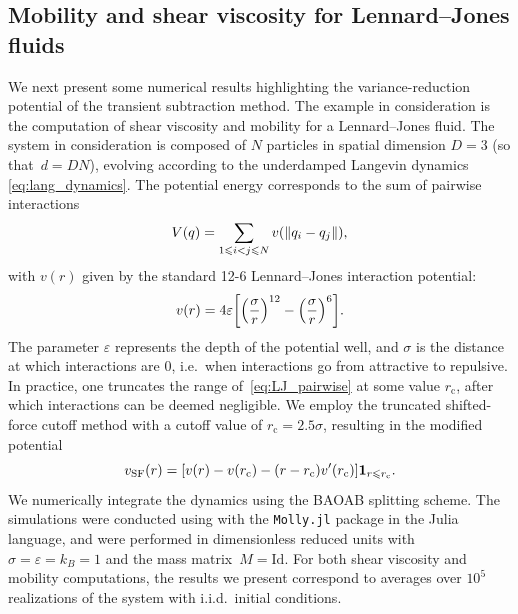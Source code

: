 \subsection{Mobility and shear viscosity for Lennard--Jones fluids}
\label{subsec:num_LJ}
%
We next present some numerical results highlighting the variance-reduction potential of the transient subtraction method. The example in consideration is the computation of shear viscosity and mobility for a Lennard--Jones fluid. The system in consideration is composed of $N$ particles in spatial dimension $D=3$ (so that~$d=DN$), evolving according to the underdamped Langevin dynamics \eqref{eq:lang_dynamics}. The potential energy corresponds to the sum of pairwise interactions
%
\begin{equation}
	V(q) = \sum_{1\leqslant i<j\leqslant N} v(\lVert q_i - q_j\rVert),
\end{equation}
%
with $v(r)$ given by the standard 12-6 Lennard--Jones interaction potential:
%
\begin{equation}
	v(r) = 4\eps\bkt*{\paren*{\frac{\sigma}{r}}^{12} - \paren*{\frac{\sigma}{r}}^6}.
	\label{eq:LJ_pairwise}
\end{equation}
%
The parameter $\varepsilon$ represents the depth of the potential well, and $\sigma$ is the distance at which interactions are 0, i.e.\ when interactions go from attractive to repulsive. In practice, one truncates the range of~\eqref{eq:LJ_pairwise} at some value $r_\mathrm{c}$, after which interactions can be deemed negligible. We employ the truncated shifted-force cutoff method with a cutoff value of $r_\mathrm{c}=2.5\sigma$, resulting in the modified potential
%
\begin{equation}
	v_\mathrm{SF}(r) = [v(r) - v(r_\mathrm{c}) - (r - r_\mathrm{c})v'(r_\mathrm{c})]\mathbf{1}_{r\leqslant r_\mathrm{c}}.
\end{equation}
%  
We numerically integrate the dynamics using the BAOAB splitting scheme. The simulations were conducted using with the \texttt{Molly.jl} package \cite{greener2024} in the Julia language, and were performed in dimensionless reduced units with $\sigma = \varepsilon = k_B = 1$ and the mass matrix~$M = \mathrm{Id}$. For both shear viscosity and mobility computations, the results we present correspond to averages over $10^5$ realizations of the system with i.i.d.\ initial conditions. 

